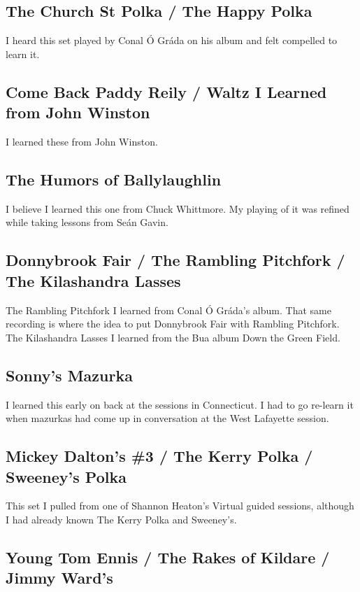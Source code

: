 \documentclass[9pt,letterpaper]{article}
\begin{document}
{\subsection{The Church St Polka / The Happy Polka}

I heard this set played by Conal \'O Gr\'ada on his album and felt compelled to learn it.

\subsection{Come Back Paddy Reily / Waltz I Learned from John Winston}

I learned these from John Winston.

\subsection{The Humors of Ballylaughlin}

I believe I learned this one from Chuck Whittmore. My playing of it was refined while taking lessons from Se\'an Gavin.

\subsection{Donnybrook Fair / The Rambling Pitchfork / The Kilashandra Lasses}

The Rambling Pitchfork I learned from Conal \'O Gr\'ada's album. That same recording is where the idea to put Donnybrook Fair with Rambling Pitchfork. The Kilashandra Lasses I learned from the Bua album Down the Green Field.

\subsection{Sonny's Mazurka}

I learned this early on back at the sessions in Connecticut. I had to go re-learn it when mazurkas had come up in conversation at the West Lafayette session.

\subsection{Mickey Dalton's \#3 / The Kerry Polka / Sweeney's Polka}

This set I pulled from one of Shannon Heaton's Virtual guided sessions, although I had already known The Kerry Polka and Sweeney's.

\subsection{Young Tom Ennis / The Rakes of Kildare / Jimmy Ward's}

}
\end{document}
